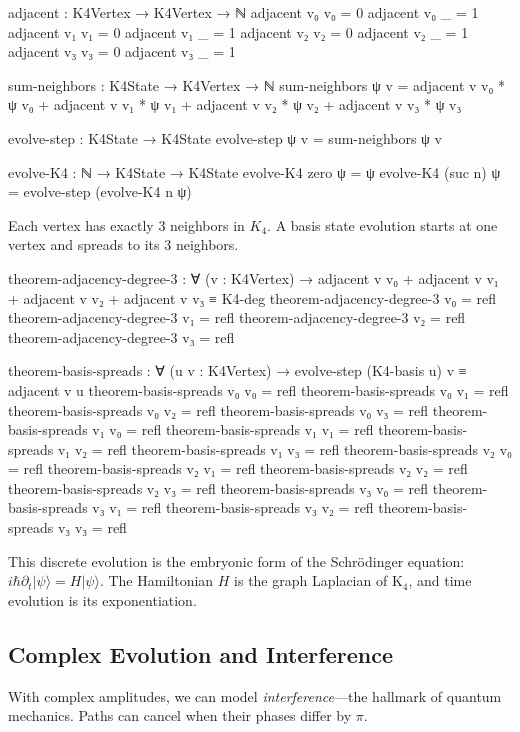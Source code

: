 \documentclass[11pt,a4paper]{book}
\begin{document}
\begin{code}
adjacent : K4Vertex → K4Vertex → ℕ
adjacent v₀ v₀ = 0
adjacent v₀ _  = 1
adjacent v₁ v₁ = 0
adjacent v₁ _  = 1
adjacent v₂ v₂ = 0
adjacent v₂ _  = 1
adjacent v₃ v₃ = 0
adjacent v₃ _  = 1

sum-neighbors : K4State → K4Vertex → ℕ
sum-neighbors ψ v = adjacent v v₀ * ψ v₀ + adjacent v v₁ * ψ v₁
                  + adjacent v v₂ * ψ v₂ + adjacent v v₃ * ψ v₃

evolve-step : K4State → K4State
evolve-step ψ v = sum-neighbors ψ v

evolve-K4 : ℕ → K4State → K4State
evolve-K4 zero ψ = ψ
evolve-K4 (suc n) ψ = evolve-step (evolve-K4 n ψ)
\end{code}

Each vertex has exactly 3 neighbors in $K_4$. A basis state evolution starts at one vertex and spreads to its 3 neighbors.

\begin{code}
theorem-adjacency-degree-3 : ∀ (v : K4Vertex) →
  adjacent v v₀ + adjacent v v₁ + adjacent v v₂ + adjacent v v₃ ≡ K4-deg
theorem-adjacency-degree-3 v₀ = refl
theorem-adjacency-degree-3 v₁ = refl
theorem-adjacency-degree-3 v₂ = refl
theorem-adjacency-degree-3 v₃ = refl

theorem-basis-spreads : ∀ (u v : K4Vertex) →
  evolve-step (K4-basis u) v ≡ adjacent v u
theorem-basis-spreads v₀ v₀ = refl
theorem-basis-spreads v₀ v₁ = refl
theorem-basis-spreads v₀ v₂ = refl
theorem-basis-spreads v₀ v₃ = refl
theorem-basis-spreads v₁ v₀ = refl
theorem-basis-spreads v₁ v₁ = refl
theorem-basis-spreads v₁ v₂ = refl
theorem-basis-spreads v₁ v₃ = refl
theorem-basis-spreads v₂ v₀ = refl
theorem-basis-spreads v₂ v₁ = refl
theorem-basis-spreads v₂ v₂ = refl
theorem-basis-spreads v₂ v₃ = refl
theorem-basis-spreads v₃ v₀ = refl
theorem-basis-spreads v₃ v₁ = refl
theorem-basis-spreads v₃ v₂ = refl
theorem-basis-spreads v₃ v₃ = refl
\end{code}

This discrete evolution is the embryonic form of the Schr\"odinger equation:
$i\hbar \partial_t |\psi\rangle = H |\psi\rangle$. The Hamiltonian $H$ is 
the graph Laplacian of K$_4$, and time evolution is its exponentiation.

\subsection{Complex Evolution and Interference}

With complex amplitudes, we can model \emph{interference}---the hallmark of
quantum mechanics. Paths can cancel when their phases differ by $\pi$.
\end{document}
